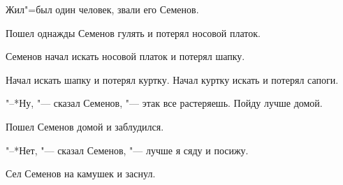
Жил"=был один человек, звали его Семенов.
    
Пошел  однажды  Семенов гулять и потерял
носовой платок.
    
Семенов  начал  искать  носовой платок и
потерял шапку.
    
Начал искать шапку и потерял куртку. Начал 
куртку искать и потерял сапоги.
    
"--*Ну, "--- сказал Семенов, "---  этак все растеряешь. 
Пойду лучше домой.
    
Пошел Семенов домой и заблудился.
    
"--*Нет, "--- сказал Семенов, "---  лучше я сяду
и посижу.
    
Сел Семенов на камушек и заснул.

